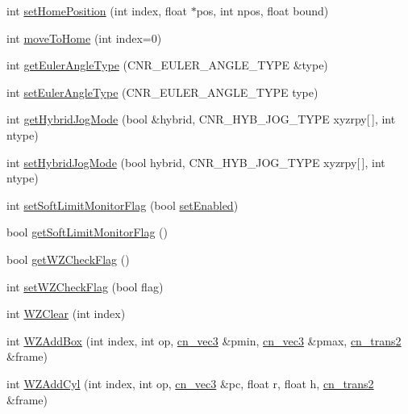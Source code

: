 \begin{DoxyCompactItemize}
\item 
int \hyperlink{classCUIApp_ab3595ed37eb43bb0c552623806e90249}{set\-Home\-Position} (int index, float $\ast$pos, int npos, float bound)
\item 
int \hyperlink{classCUIApp_ae4246ee91a5f098604d03d8459f1b634}{move\-To\-Home} (int index=0)
\item 
int \hyperlink{classCUIApp_a392d9f88563aa020c997f11a829dc909}{get\-Euler\-Angle\-Type} (C\-N\-R\-\_\-\-E\-U\-L\-E\-R\-\_\-\-A\-N\-G\-L\-E\-\_\-\-T\-Y\-P\-E \&type)
\item 
int \hyperlink{classCUIApp_a18eca8206aa0eedab39af17c3e55c511}{set\-Euler\-Angle\-Type} (C\-N\-R\-\_\-\-E\-U\-L\-E\-R\-\_\-\-A\-N\-G\-L\-E\-\_\-\-T\-Y\-P\-E type)
\item 
int \hyperlink{classCUIApp_aec69bd13266bc0bb999b2f3d28bc17b3}{get\-Hybrid\-Jog\-Mode} (bool \&hybrid, C\-N\-R\-\_\-\-H\-Y\-B\-\_\-\-J\-O\-G\-\_\-\-T\-Y\-P\-E xyzrpy\mbox{[}$\,$\mbox{]}, int ntype)
\item 
int \hyperlink{classCUIApp_a4d5e32f869d8cd37f595ac0581c548c0}{set\-Hybrid\-Jog\-Mode} (bool hybrid, C\-N\-R\-\_\-\-H\-Y\-B\-\_\-\-J\-O\-G\-\_\-\-T\-Y\-P\-E xyzrpy\mbox{[}$\,$\mbox{]}, int ntype)
\item 
int \hyperlink{classCUIApp_af643f6bcefda4737060fb9225a304ed8}{set\-Soft\-Limit\-Monitor\-Flag} (bool \hyperlink{classCUIApp_a0bb9aaecc950f991d3ecc69e5895e9e6}{set\-Enabled})
\item 
bool \hyperlink{classCUIApp_a87e000f4f97ea7f78c3e40cb2ed305cd}{get\-Soft\-Limit\-Monitor\-Flag} ()
\item 
bool \hyperlink{classCUIApp_abed1cf29c30732ab50dc8f35fad4b0cc}{get\-W\-Z\-Check\-Flag} ()
\item 
int \hyperlink{classCUIApp_ac40434c0be2592ca21b59d47bd59bad7}{set\-W\-Z\-Check\-Flag} (bool flag)
\item 
int \hyperlink{classCUIApp_ab5c2ed7bd5bacb715485e286e3d9e33e}{W\-Z\-Clear} (int index)
\item 
int \hyperlink{classCUIApp_a7ae08ed44f496fe5a3eeb0ec2c828fdb}{W\-Z\-Add\-Box} (int index, int op, \hyperlink{structcn__vec3}{cn\-\_\-vec3} \&pmin, \hyperlink{structcn__vec3}{cn\-\_\-vec3} \&pmax, \hyperlink{structcn__trans2}{cn\-\_\-trans2} \&frame)
\item 
int \hyperlink{classCUIApp_a499e134cf18fc918a83e0cd31fd56ba6}{W\-Z\-Add\-Cyl} (int index, int op, \hyperlink{structcn__vec3}{cn\-\_\-vec3} \&pc, float r, float h, \hyperlink{structcn__trans2}{cn\-\_\-trans2} \&frame)
\item 

\end{DoxyCompactItemize}
